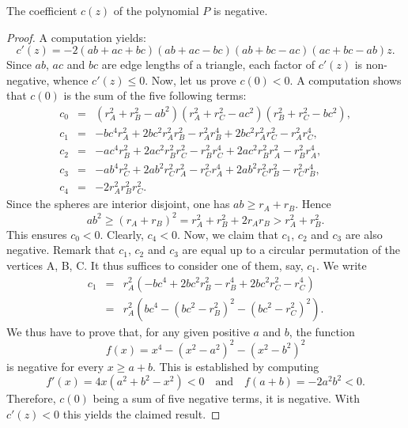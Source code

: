 \documentclass[10pt,a4paper]{amsart}
\begin{document}
\begin{lemma}
\label{lem:negative_C}
The coefficient $c(z)$ of the polynomial $P$ is negative.
\end{lemma}

\begin{proof}
A computation yields:
\[
c'(z)=-2(ab+ac+bc)(ab+ac-bc)(ab+bc-ac)(ac+bc-ab)z.
\]
Since $ab$, $ac$ and $bc$ are edge lengths of a triangle, each factor of $c'(z)$ is non-negative, whence $c'(z)\leq 0$.
Now, let us prove $c(0)<0$.
A computation shows that $c(0)$ is the sum of the five following terms:
\begin{eqnarray*}
c_0&=&(r_A^2+r_B^2-ab^2)(r_A^2+r_C^2-ac^2)(r_B^2+r_C^2-bc^2),\\
c_1&=&-bc^4r_A^2 + 2bc^2r_A^2r_B^2 - r_A^2r_B^4 + 2bc^2r_A^2r_C^2 - r_A^2r_C^4,\\
c_2&=&-ac^4r_B^2 + 2ac^2r_B^2r_C^2 - r_B^2r_C^4 + 2ac^2r_B^2r_A^2 - r_B^2r_A^4,\\
c_3&=&-ab^4r_C^2 + 2ab^2r_C^2r_A^2 - r_C^2r_A^4 + 2ab^2r_C^2r_B^2 - r_C^2r_B^4,\\
c_4&=&-2r_A^2r_B^2r_C^2.
\end{eqnarray*}
Since the spheres are interior disjoint, one has $ab\geq r_A+r_B$.
Hence
\[
ab^2\geq (r_A+r_B)^2=r_A^2+r_B^2+2r_Ar_B> r_A^2+r_B^2.
\]
This ensures $c_0<0$. 
Clearly, $c_4<0$.
Now, we claim that $c_1$, $c_2$ and $c_3$ are also negative.
Remark that $c_1$, $c_2$ and $c_3$ are equal up to a circular permutation of the vertices A, B, C.
It thus suffices to consider one of them, say, $c_1$.
We write
\begin{eqnarray*}
c_1
&=&r_A^2(-bc^4 + 2bc^2r_B^2 - r_B^4 + 2bc^2r_C^2 - r_C^4)\\
&=&r_A^2(bc^4-(bc^2-r_B^2)^2-(bc^2-r_C^2)^2).
\end{eqnarray*}
We thus have to prove that, for any given positive $a$ and $b$, the function
\[
f(x)=x^4-(x^2-a^2)^2-(x^2-b^2)^2
\]
is negative for every $x\geq a+b$.
This is established by computing
\[
f'(x)=4x(a^2+b^2-x^2)<0
\quad\textrm{and}\quad
f(a+b)=-2a^2b^2<0.
\]
Therefore, $c(0)$ being a sum of five negative terms, it is negative.
With $c'(z)<0$ this yields the claimed result.
\end{proof}
\end{document}
